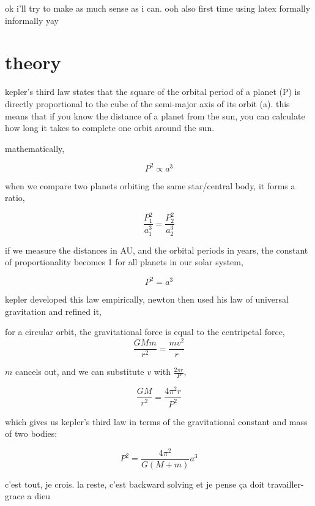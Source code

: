 \documentclass{article}
\begin{document}
ok i'll try to make as much sense as i can. ooh also first time using latex formally informally yay
\bigskip

\section{theory}

kepler's third law states that the square of the orbital period of a planet (P) is directly proportional to the cube of the semi-major axis of its orbit (a). this means that if you know the distance of a planet from the sun, you can calculate how long it takes to complete one orbit around the sun.
\smallskip

mathematically,

\begin{equation}
P^2 \propto a^3
\end{equation}

when we compare two planets orbiting the same star/central body, it forms a ratio,

\begin{equation}
\frac{P_1^2}{a_1^3} = \frac{P_2^2}{a_2^3}
\end{equation}

if we measure the distances in AU, and the orbital periods in years, the constant of proportionality becomes 1 for all planets in our solar system,

\begin{equation}
P^2 = a^3
\end{equation}

kepler developed this law empirically, newton then used his law of universal gravitation and refined it,

for a circular orbit, the gravitational force is equal to the centripetal force,
\begin{equation}
\frac{GMm}{r^2} = \frac{mv^2}{r}
\end{equation}

$m$ cancels out, and we can substitute $v$ with $\frac{2\pi r}{P}$,

\begin{equation}
\frac{GM}{r^2} = \frac{4\pi^2 r}{P^2}
\end{equation}

which gives us kepler's third law in terms of the gravitational constant and mass of two bodies:

\begin{equation}
P^2 = \frac{4\pi^2}{G(M+m)}a^3
\end{equation}

c'est tout, je crois. la reste, c'est backward solving et je pense ça doit travailler- grace a dieu
\end{document}
